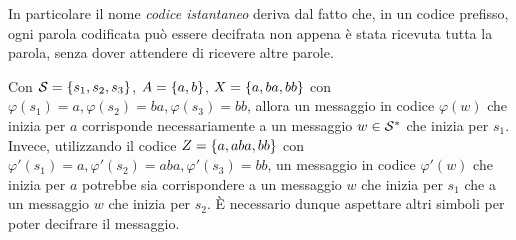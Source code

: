 In particolare il nome \emph{codice istantaneo} deriva dal fatto che, in un codice prefisso, ogni parola codificata può essere decifrata non appena è stata ricevuta tutta la parola, senza dover attendere di ricevere altre parole.

\begin{example}
  Con \(\SCal = \set{s_1,s_2,s_3}\), \(A = \set{a,b}\), \(X = \set{a,ba,bb}\) con \(\varphi(s_1) = a, \varphi(s_2) = ba, \varphi(s_3) = bb\), allora un messaggio in codice \(\varphi(w)\) che inizia per \(a\) corrisponde necessariamente a un messaggio \(w \in \mathcal{S}^*\) che inizia per \(s_1\).
  Invece, utilizzando il codice \(Z = \set{a,aba,bb}\) con \(\varphi'(s_1) = a, \varphi'(s_2) = aba, \varphi'(s_3) = bb\), un messaggio in codice \(\varphi'(w)\) che inizia per \(a\) potrebbe sia corrispondere a un messaggio \(w\) che inizia per \(s_1\) che a un messaggio \(w\) che inizia per \(s_2\).
  È necessario dunque aspettare altri simboli per poter decifrare il messaggio.
\end{example}